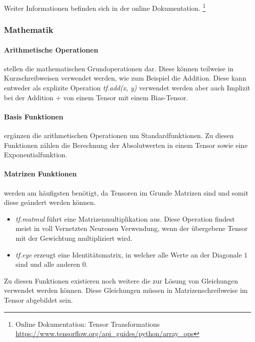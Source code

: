 \phantom \newline

\noindent
Weiter Informationen befinden sich in der online Dokumentation. \footnote{Online Dokumentation: Tensor Transformations \url{https://www.tensorflow.org/api_guides/python/array_ops}}

\subsubsection{Mathematik} 

\paragraph{Arithmetische Operationen} stellen die mathematischen Grundoperationen dar. 
Diese können teilweise in Kurzschreibweisen verwendet werden, wie zum Beispiel die Addition. 
Diese kann entweder als explizite Operation \textit{tf.add(x, y)} verwendet werden aber auch Implizit bei der Addition $+$ von einem Tensor mit einem Bias-Tensor.

\paragraph{Basis Funktionen} ergänzen die arithmetischen Operationen um Standardfunktionen. 
Zu diesen Funktionen zählen die Berechnung der Absolutwerten in einem Tensor sowie eine Exponentialfunktion. 

\paragraph{Matrizen Funktionen} werden am häufigsten benötigt, da Tensoren im Grunde Matrizen sind und somit diese geändert werden können. 
\begin{itemize}
	\item \textit{tf.matmul} führt eine Matrizenmultiplikation aus. 
	Diese Operation findest meist in voll Vernetzten Neuronen Verwendung, wenn der übergebene Tensor mit der Gewichtung multipliziert wird. 
	\item \textit{tf.eye} erzeugt eine Identitätsmatrix, in welcher alle Werte an der Diagonale $1$ sind und alle anderen $0$. 
\end{itemize}

Zu diesen Funktionen existieren noch weitere die zur Lösung von Gleichungen verwendet werden können. 
Diese Gleichungen müssen in Matrizenschreibweise im Tensor abgebildet sein. 

